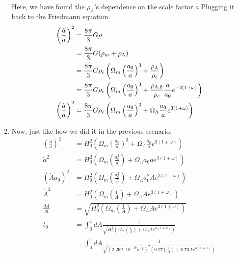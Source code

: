 \begin{enumerate}[label=(\alph*)]
\begin{align}
\end{align}
Here, we have found the $\rho_{\Lambda}$'s dependence on the scale factor $a$.Plugging it back to the Friedmann equation.
\begin{align}
\left( \frac{\dot{a}}{a}\right)^2 &=  \frac{8\pi}{3} G \rho\notag \\
						 &=  \frac{8\pi}{3} G (\rho_{m}+\rho_{\Lambda})\notag \\
						 &=  \frac{8\pi}{3} G \rho_c \left( \Omega_m \left( \frac{a_0}{a}\right)^3 + \frac{\rho_{\Lambda}}{\rho_c} \right)\notag \\
						 &=  \frac{8\pi}{3} G \rho_c \left( \Omega_m \left( \frac{a_0}{a}\right)^3 + \frac{\rho_{\Lambda,0}}{\rho_c }\frac{a}{a_0}e^{-3(1+\omega)}\right)\notag \\
\left( \frac{\dot{a}}{a}\right)^2  &=  \frac{8\pi}{3} G \rho_c\left( 	\Omega_m \left( \frac{a_0}{a}\right)^3 + \Omega_{\Lambda}\frac{a_0}{a}e^{3(1+\omega)}	\right)
\end{align}
\item Now, just like how we did it in the previous scenario,
\begin{align*}
\left( \frac{\dot{a}}{a}\right)^2 	 &=  H_0^2 \left( 	\Omega_m \left( \frac{a_0}{a}\right)^3 + \Omega_{\Lambda}\frac{a_0}{a}e^{3(1+\omega)}	\right) \\
\dot{a}^2 	 &=   H_0^2  \left( 	\Omega_m \left( \frac{a_0^3}{a}\right) + \Omega_{\Lambda}a_0ae^{3(1+\omega)}	\right) \\
(\dot{A}a_0)^2 	 &=   H_0^2  \left( 	\Omega_m \left( \frac{a_0^2}{A}\right) + \Omega_{\Lambda}a_0^2 A e^{3(1+\omega)}	\right)\\
\dot{A}^2 	 &=   H_0^2  \left( 	\Omega_m \left( \frac{1}{A}\right) + \Omega_{\Lambda}A e^{3(1+\omega)}	\right)\\
\frac{dA}{dt} 	 &=   \sqrt{H_0^2  \left( 	\Omega_m \left( \frac{1}{A}\right) + \Omega_{\Lambda}A e^{3(1+\omega)}	\right)}\\
t_0 &= \int^{1}_0 dA \frac{1}{\sqrt{H_0^2  \left( 	\Omega_m \left( \frac{1}{A}\right) + \Omega_{\Lambda}A e^{3(1+\omega)}	\right)}}\\
	&= \int^{1}_0 dA \frac{1}{\sqrt{(2.269 \cdot 10^{-18}s^{-1})^2  \left( 0.27 \left( \frac{1}{A}\right) + 0.73 A e^{3(1+\omega)}	\right)}}
\end{align*}

\end{enumerate}
